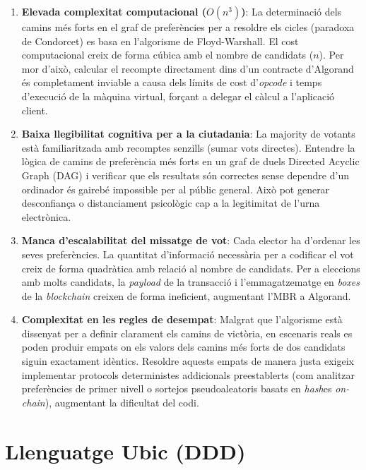 \begin{enumerate}
    \item \textbf{Elevada complexitat computacional ($O(n^3)$)}: La determinació dels camins més forts en el graf de
    preferències per a resoldre els cicles (paradoxa de Condorcet) es basa en l'algorisme de Floyd-Warshall.
    El cost computacional creix de forma cúbica amb el nombre de candidats ($n$).
    Per mor d'això, calcular el recompte directament dins d'un contracte d'Algorand és completament inviable a causa
    dels límits de cost d'\textit{opcode} i temps d'execució de la màquina virtual, forçant a delegar el càlcul a
    l'aplicació client.

    \item \textbf{Baixa llegibilitat cognitiva per a la ciutadania}: La majority de votants està familiaritzada amb
    recomptes senzills (sumar vots directes).
    Entendre la lògica de camins de preferència més forts en un graf de duels Directed Acyclic Graph (DAG) i verificar
    que els resultats són correctes sense dependre d'un ordinador és gairebé impossible per al públic general.
    Això pot generar desconfiança o distanciament psicològic cap a la legitimitat de l'urna electrònica.

    \item \textbf{Manca d'escalabilitat del missatge de vot}: Cada elector ha d'ordenar les seves preferències.
    La quantitat d'informació necessària per a codificar el vot creix de forma quadràtica amb relació al nombre de
    candidats.
    Per a eleccions amb molts candidats, la \textit{payload} de la transacció i l'emmagatzematge en \textit{boxes} de la
    \textit{blockchain} creixen de forma ineficient, augmentant l'MBR a Algorand.

    \item \textbf{Complexitat en les regles de desempat}: Malgrat que l'algorisme està dissenyat per a definir clarament
    els camins de victòria, en escenaris reals es poden produir empats on els valors dels camins més forts de dos
    candidats siguin exactament idèntics.
    Resoldre aquests empats de manera justa exigeix implementar protocols deterministes addicionals preestablerts (com
    analitzar preferències de primer nivell o sortejos pseudoaleatoris basats en \textit{hash}es \textit{on-chain}),
    augmentant la dificultat del codi.
\end{enumerate}


\section{Llenguatge Ubic (DDD)}
\label{sec:llenguatge-ubic}

